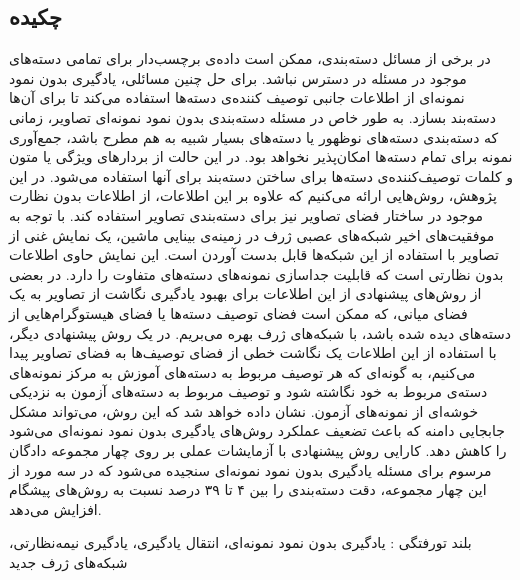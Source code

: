 


\pagestyle{empty}

\subsection*{چکیده}

در برخی از مسائل دسته‌بندی، ممکن است داده‌ی برچسب‌دار برای تمامی دسته‌های موجود در مسئله در دسترس نباشد. برای حل چنین مسائلی، یادگیری بدون نمود نمونه‌ای از اطلاعات جانبی توصیف کننده‌ی دسته‌ها استفاده می‌کند تا برای آن‌ها دسته‌بند بسازد. به طور خاص در مسئله دسته‌بندی بدون نمود نمونه‌ای تصاویر، زمانی که دسته‌بندی دسته‌های نوظهور یا دسته‌های بسیار شبیه به هم مطرح باشد، جمع‌آوری نمونه برای تمام دسته‌ها امکان‌پذیر نخواهد بود. در این حالت از بردارهای ویژگی یا متون و کلمات توصیف‌کننده‌ی دسته‌ها برای ساختن دسته‌بند برای آنها استفاده می‌شود. در این پژوهش، روش‌هایی ارائه می‌کنیم که علاوه بر این اطلاعات، از اطلاعات بدون نظارت موجود در ساختار فضای تصاویر نیز برای دسته‌بندی تصاویر استفاده کند. با توجه به موفقیت‌های اخیر شبکه‌های عصبی ژرف در زمینه‌ی بینایی ماشین، یک نمایش غنی از تصاویر با استفاده از این شبکه‌ها قابل بدست آوردن است. این نمایش حاوی اطلاعات بدون نظارتی است که قابلیت جداسازی نمونه‌های دسته‌های متفاوت را دارد. در بعضی از روش‌های پیشنهادی از این اطلاعات برای بهبود یادگیری نگاشت از تصاویر به یک فضای میانی، که ممکن است فضای توصیف دسته‌ها یا فضای هیستوگرام‌هایی از دسته‌های دیده شده باشد،  با شبکه‌های ژرف بهره می‌بریم. در یک روش پیشنهادی دیگر، با استفاده از این اطلاعات یک نگاشت خطی از فضای توصیف‌ها به فضای تصاویر پیدا می‌کنیم، به گونه‌ای که هر توصیف مربوط به دسته‌های آموزش به مرکز نمونه‌های دسته‌ی مربوط به خود نگاشته شود و توصیف مربوط به دسته‌های آزمون به نزدیکی خوشه‌ای از نمونه‌های آزمون. نشان داده خواهد شد که این روش،
می‌تواند مشکل جابجایی دامنه که باعث تضعیف عملکرد روش‌های یادگیری بدون نمود نمونه‌ای می‌شود را کاهش دهد. کارایی روش پیشنهادی با آزمایشات عملی بر روی چهار مجموعه دادگان مرسوم برای مسئله یادگیری بدون نمود نمونه‌ای سنجیده می‌شود که در سه مورد از این چهار مجموعه، دقت دسته‌بندی را بین ۴ تا ۳۹ درصد  نسبت به روش‌های پیشگام افزایش می‌دهد.


‌بلند
‌تورفتگی : 
یادگیری بدون نمود نمونه‌ای، انتقال یادگیری، یادگیری نیمه‌نظارتی، شبکه‌های ژرف
‌جدید
